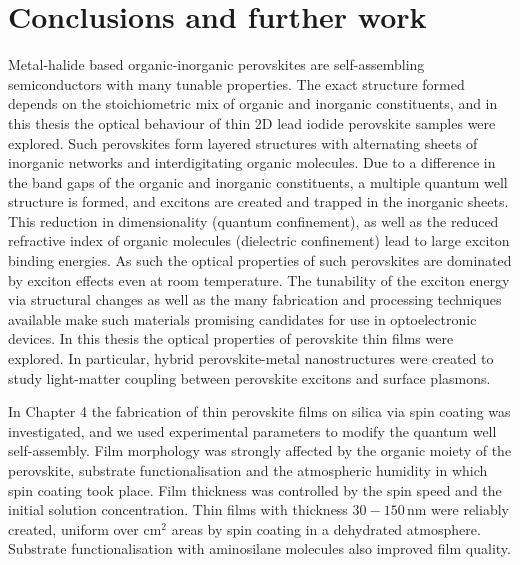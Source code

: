 
\chapter{Conclusions and further work}

\graphicspath{{Chapter8/Figures/}}

Metal-halide based organic-inorganic perovskites are self-assembling semiconductors with many tunable properties. The exact structure formed depends on the stoichiometric mix of organic and inorganic constituents, and in this thesis the optical behaviour of thin 2D lead iodide perovskite samples were explored. Such perovskites form layered structures with alternating sheets of inorganic  networks and interdigitating organic molecules. Due to a difference in the band gaps of the organic and inorganic constituents, a multiple quantum well structure is formed, and excitons are created and trapped in the inorganic sheets. This reduction in dimensionality (quantum confinement), as well as the reduced refractive index of organic molecules (dielectric confinement) lead to large exciton binding energies. As such the optical properties of such perovskites are dominated by exciton effects even at room temperature. The tunability of the exciton energy via structural changes as well as the many fabrication and processing techniques available make such materials promising candidates for use in optoelectronic devices. In this thesis the optical properties of perovskite thin films were explored. In particular, hybrid perovskite-metal nanostructures were created to study light-matter coupling between perovskite excitons and surface plasmons.

In Chapter 4 the fabrication of thin perovskite films on silica via spin coating was investigated, %
and we used experimental parameters to modify the quantum well self-assembly. %
Film morphology was strongly affected by the organic moiety of the perovskite, substrate functionalisation and the atmospheric humidity in which spin coating took place. Film thickness was controlled by the spin speed and the initial solution concentration. Thin films with thickness $30-150$\,nm were reliably created, uniform over cm$^2$ areas by spin coating in a dehydrated atmosphere. Substrate functionalisation with aminosilane molecules also improved film quality. %


